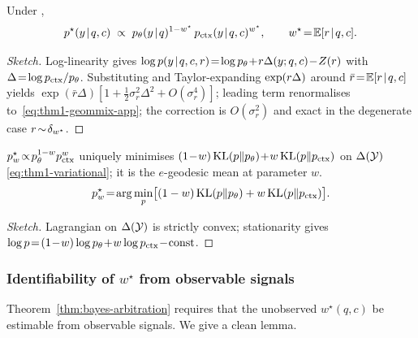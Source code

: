 \begin{proposition}
\label{prop:thm1-step3}
Under ,
\begin{equation}
p^\star(y\!\mid\!q,c)\;\propto\;
p_\theta(y\!\mid\!q)^{1-w^\star}\,
p_\ctx(y\!\mid\!q,c)^{w^\star},\qquad
w^\star\!=\!\E[\reli\!\mid\!q,c].
\label{eq:thm1-geommix-app}
\end{equation}
\end{proposition}

\begin{proof}[Sketch]
Log-linearity gives
$\log p(y\!\mid\!q,c,\reli)\!=\!\log p_\theta\!+\!\reli\Delta(y;q,c)\!-\!Z(\reli)$
with $\Delta\!=\!\log p_{\mathrm{ctx}}/p_\theta$.  Substituting and Taylor-expanding
$\exp(r\Delta)$ around $\bar r\!=\!\mathbb{E}[r\!\mid\!q,c]$ yields
$\exp(\bar r\Delta)[1\!+\!\tfrac12\sigma_r^2\Delta^2\!+\!O(\sigma_r^4)]$;
leading term renormalises to~\eqref{eq:thm1-geommix-app}; the correction
is $O(\sigma_r^2)$ and exact in the degenerate case
$r\!\sim\!\delta_{w^\star}$.
\end{proof}

\begin{proposition}
\label{prop:thm1-variational}
$p^\star_w\!\propto\!p_\theta^{1-w}p_{\mathrm{ctx}}^w$ uniquely minimises
$(1\!-\!w)\operatorname{KL}(p\|p_\theta)\!+\!w\operatorname{KL}(p\|p_{\mathrm{ctx}})$ on $\Delta(\mathcal{Y})$
\eqref{eq:thm1-variational}; it is the $e$-geodesic mean at parameter $w$.
\begin{equation}
p^\star_w\!=\!\arg\min_p\bigl[(1-w)\operatorname{KL}(p\|p_\theta)+w\operatorname{KL}(p\|p_{\mathrm{ctx}})\bigr].
\label{eq:thm1-variational}
\end{equation}
\end{proposition}

\begin{proof}[Sketch]
Lagrangian on $\Delta(\mathcal{Y})$ is strictly convex; stationarity gives
$\log p\!=\!(1\!-\!w)\log p_\theta\!+\!w\log p_\ctx\!-\!\text{const}$.
\end{proof}

\subsubsection{Identifiability of $w^\star$ from observable signals}
\label{app:thm1-identifiability}

Theorem~\ref{thm:bayes-arbitration} requires that the unobserved $w^\star(q,c)$
be estimable from observable signals.  We give a clean lemma.

